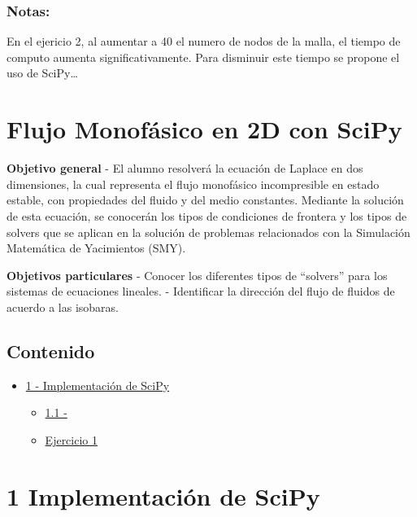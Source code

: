 \documentclass[
  letterpaper,
  DIV=11,
  numbers=noendperiod]{scrreprt}
\providecommand{\tightlist}{%
  \setlength{\itemsep}{0pt}\setlength{\parskip}{0pt}}\usepackage{longtable,booktabs,array}
\begin{document}
\subsection{Notas:}\label{notas}

En el ejericio 2, al aumentar a 40 el numero de nodos de la malla, el
tiempo de computo aumenta significativamente. Para disminuir este tiempo
se propone el uso de SciPy\ldots{}


\chapter{Flujo Monofásico en 2D con
SciPy}\label{flujo-monofuxe1sico-en-2d-con-scipy}

\textbf{Objetivo general} - El alumno resolverá la ecuación de Laplace
en dos dimensiones, la cual representa el flujo monofásico incompresible
en estado estable, con propiedades del fluido y del medio constantes.
Mediante la solución de esta ecuación, se conocerán los tipos de
condiciones de frontera y los tipos de solvers que se aplican en la
solución de problemas relacionados con la Simulación Matemática de
Yacimientos (SMY).

\textbf{Objetivos particulares} - Conocer los diferentes tipos de
``solvers'' para los sistemas de ecuaciones lineales. - Identificar la
dirección del flujo de fluidos de acuerdo a las isobaras.

\section{Contenido}\label{contenido-1}

\begin{itemize}
\tightlist
\item
  \hyperref[1]{1 - Implementación de SciPy}

  \begin{itemize}
  \tightlist
  \item
    \hyperref[3.1]{1.1 -}
  \item
    \hyperref[ej-1]{Ejercicio 1}
  \end{itemize}
\end{itemize}


\chapter{1 Implementación de SciPy}\label{implementaciuxf3n-de-scipy}
\end{document}
